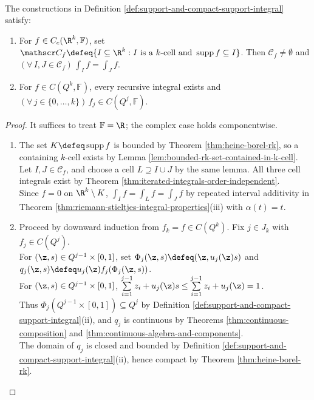 \begin{proposition} \label{prop:support-and-simplex-integrals-well-defined} \\
The constructions in Definition \ref{def:support-and-compact-support-integral} satisfy:
\begin{enumerate}[label=(\roman*)]
\setlength{\itemsep}{0pt}
\item For $f\in C_c(\R^k,\mathbb F)$, set $\mathscr C_f\defeq\{I\subseteq\R^k:I\text{ is a $k$-cell and }\operatorname{supp}f\subseteq I\}$. Then $\mathscr C_f\neq\emptyset$ and $(\forall\,I,J\in\mathscr C_f)\,\int_I f=\int_J f$.
\item For $f\in C(Q^k,\mathbb F)$, every recursive integral exists and $(\forall\,j\in\{0,\ldots,k\})\,f_j\in C(Q^j,\mathbb F)$.
\end{enumerate}
\begin{proof}
It suffices to treat $\mathbb F=\R$; the complex case holds componentwise.
\begin{enumerate}[label=(\roman*)]
\setlength{\itemsep}{0pt}
\item The set $K\defeq\operatorname{supp}f$ is bounded by Theorem \ref{thm:heine-borel-rk}, so a containing $k$-cell exists by Lemma \ref{lem:bounded-rk-set-contained-in-k-cell}.\\
Let $I,J\in\mathscr C_f$, and choose a cell $L\supseteq I\cup J$ by the same lemma. All three cell integrals exist by Theorem \ref{thm:iterated-integrals-order-independent}.\\
Since $f=0$ on $\R^k\setminus K$, $\int_I f=\int_L f=\int_J f$ by repeated interval additivity in Theorem \ref{thm:riemann-stieltjes-integral-properties}(iii) with $\alpha(t)=t$.
\item Proceed by downward induction from $f_k=f\in C(Q^k)$. Fix $j\in J_k$ with $f_j\in C(Q^j)$.\\
For $(\z,s)\in Q^{j-1}\times[0,1]$, set $\Phi_j(\z,s)\defeq(\z,u_j(\z)s)$ and $q_j(\z,s)\defeq u_j(\z)f_j(\Phi_j(\z,s))$.\\
For $(\z,s)\in Q^{j-1}\times[0,1]$, $\sum\limits_{i=1}^{j-1}z_i+u_j(\z)s\leq\sum\limits_{i=1}^{j-1}z_i+u_j(\z)=1$.\\
Thus $\Phi_j(Q^{j-1}\times[0,1])\subseteq Q^j$ by Definition \ref{def:support-and-compact-support-integral}(ii), and $q_j$ is continuous by Theorems \ref{thm:continuous-composition} and \ref{thm:continuous-algebra-and-components}.\\
The domain of $q_j$ is closed and bounded by Definition \ref{def:support-and-compact-support-integral}(ii), hence compact by Theorem \ref{thm:heine-borel-rk}.\\

\end{enumerate}
\end{proof}
\end{proposition}
